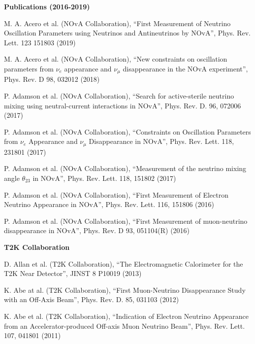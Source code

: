 {\bf Publications (2016-2019)}
\begin{list2}
\item M. A. Acero et al. (NOvA Collaboration), ``First Measurement of Neutrino Oscillation Parameters using Neutrinos and Antineutrinos by NOvA'', Phys. Rev. Lett. 123 151803 (2019)
\item M. A. Acero et al. (NOvA Collaboration), ``New constraints on oscillation parameters from $\nu_e$ appearance and $\nu_\mu$ disappearance in the NOvA experiment'', Phys. Rev. D 98, 032012 (2018)
\item P. Adamson et al. (NOvA Collaboration), ``Search for active-sterile neutrino mixing using neutral-current interactions in NOvA'', Phys. Rev. D. 96, 072006 (2017)
\item P. Adamson et al. (NOvA Collaboration), ``Constraints on Oscillation Parameters from $\nu_e$ Appearance and $\nu_\mu$ Disappearance in NOvA'', Phys. Rev. Lett. 118, 231801 (2017)
\item P. Adamson et al. (NOvA Collaboration), ``Measurement of the neutrino mixing angle $\theta_{23}$ in NOvA'', Phys. Rev. Lett. 118, 151802 (2017)
\item P. Adamson et al. (NOvA Collaboration), ``First Measurement of Electron Neutrino Appearance in NOvA'', Phys. Rev. Lett. 116, 151806 (2016)
\item P. Adamson et al. (NOvA Collaboration), ``First Measurement of muon-neutrino disappearance in NOvA'', Phys. Rev. D 93, 051104(R) (2016)
\end{list2}

{\bf T2K Collaboration}
\begin{list2}
\item D. Allan et al. (T2K Collaboration), ``The Electromagnetic Calorimeter for the T2K Near Detector'', JINST 8 P10019 (2013)
\item K. Abe at al. (T2K Collaboration), ``First Muon-Neutrino Disappearance Study with an Off-Axis Beam'', Phys. Rev. D. 85, 031103 (2012)
\item K. Abe et al. (T2K Collaboration), ``Indication of Electron Neutrino Appearance from an Accelerator-produced Off-axis Muon Neutrino Beam'', Phys. Rev. Lett. 107, 041801 (2011)
\end{list2}

